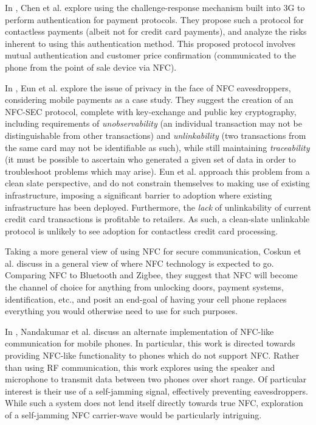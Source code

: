 
In \cite{chen2010using}, Chen et al. explore using the challenge-response mechanism built into 3G to perform authentication for payment protocols.
They propose such a protocol for contactless payments (albeit not for credit card payments), and analyze the risks inherent to using this authentication method.
This proposed protocol involves mutual authentication and customer price confirmation (communicated to the phone from the point of sale device via NFC).

In \cite{eun2013conditional}, Eun et al. explore the issue of privacy in the face of NFC eavesdroppers, considering mobile payments as a case study.
They suggest the creation of an NFC-SEC protocol, complete with key-exchange and public key cryptography, including requirements of
    \emph{unobservability} (an individual transaction may not be distinguishable from other transactions) and
    \emph{unlinkability} (two transactions from the same card may not be identifiable as such), while still maintaining
    \emph{traceability} (it must be possible to ascertain who generated a given set of data in order to troubleshoot problems which may arise).
Eun et al. approach this problem from a clean slate perspective, and do not constrain themselves to making use of existing infrastructure,
    imposing a significant barrier to adoption where existing infrastructure has been deployed.
Furthermore, the \emph{lack} of unlinkability of current credit card transactions is profitable to retailers.
As such, a clean-slate unlinkable protocol is unlikely to see adoption for contactless credit card processing.

Taking a more general view of using NFC for secure communication,
    Coskun et al. discuss in \cite{Coskun2013} a general view of where NFC technology is expected to go.
Comparing NFC to Bluetooth and Zigbee, they suggest that NFC will become the channel of choice for anything from unlocking doors, payment systems, identification, etc.,
    and posit an end-goal of having your cell phone replaces everything you would otherwise need to use for such purposes.

In \cite{nandakumar2013dhwani}, Nandakumar et al. discuss an alternate implementation of NFC-like communication for mobile phones.
In particular, this work is directed towards providing NFC-like functionality to phones which do not support NFC.
Rather than using RF communication, this work explores using the speaker and microphone to transmit data between two phones over short range.
Of particular interest is their use of a self-jamming signal, effectively preventing eavesdroppers.
While such a system does not lend itself directly towards true NFC, exploration of a self-jamming NFC carrier-wave would be particularly intriguing.
